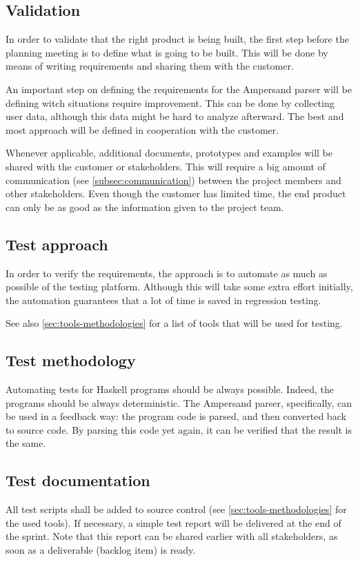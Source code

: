 \subsection{Validation}
In order to validate that the right product is being built, the first step before the planning meeting is to define what is going to be built.
This will be done by means of writing requirements and sharing them with the customer.

An important step on defining the requirements for the Ampersand parser will be defining witch situations require improvement.
This can be done by collecting user data, although this data might be hard to analyze afterward.
The best and most approach will be defined in cooperation with the customer.

Whenever applicable, additional documents, prototypes and examples will be shared with the customer or stakeholders.
This will require a big amount of communication (see \autoref{subsec:communication}) between the project members and other stakeholders.
Even though the customer has limited time, the end product can only be as good as the information given to the project team.

\subsection{Test approach}
In order to verify the requirements, the approach is to automate as much as possible of the testing platform.
Although this will take some extra effort initially, the automation guarantees that a lot of time is saved in regression testing.

See also \autoref{sec:tools-methodologies} for a list of tools that will be used for testing.

\subsection{Test methodology}
Automating tests for Haskell programs should be always possible.
Indeed, the programs should be always deterministic.
The Ampersand parser, specifically, can be used in a feedback way: the program code is parsed, and then converted back to source code.
By parsing this code yet again, it can be verified that the result is the same.

\subsection{Test documentation}
\label{subsec:test-documentation}
All test scripts shall be added to source control (see \autoref{sec:tools-methodologies} for the used tools).
If necessary, a simple test report will be delivered at the end of the sprint.
Note that this report can be shared earlier with all stakeholders, as soon as a deliverable (backlog item) is ready.

